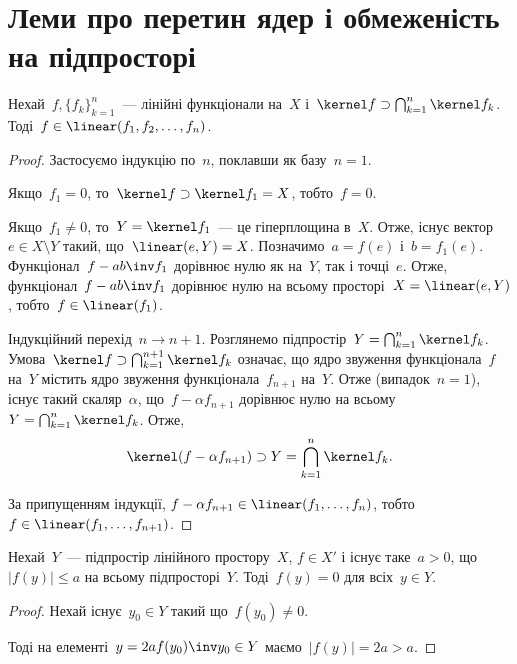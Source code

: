 \section{Леми про перетин ядер і обмеженість на підпросторі}

\begin{lemma}
    \label{lem:kernel-intersection-supset-linear-combination}
    Нехай~$f, \{f_k\}_{k = 1}^n$~--- лінійні функціонали на~$X$ і~$\kernel f \supset \bigcap_{k = 1}^n \kernel f_k$. Тоді~$f \in \linear(f_1, f_2, \dots, f_n)$.
\end{lemma}

\begin{proof}
    Застосуємо індукцію по~$n$, поклавши як базу~$n = 1$.

    Якщо~$f_1 = 0$, то~$\kernel f \supset \kernel f_1 = X$, тобто~$f = 0$.

    Якщо~$f_1 \ne 0$, то~$Y = \kernel f_1$~--- це гіперплощина в~$X$. Отже, існує вектор~$e \in X \setminus Y$ такий, що~$\linear(e, Y) = X$. Позначимо~$a = f(e)$ і~$b = f_1(e)$. Функціонал~$f - ab\inv f_1$ дорівнює нулю як на~$Y$, так і точці~$e$. Отже, функціонал~$f - ab\inv f_1$ дорівнює нулю на всьому просторі~$X = \linear(e, Y)$, тобто~$f \in \linear(f_1)$.

    Індукційний перехід~$n \to n + 1$. Розглянемо підпростір~$Y = \bigcap_{k = 1}^n \kernel f_k$. Умова~$\kernel f \supset \bigcap_{k = 1}^{n + 1} \kernel f_k$ означає, що ядро звуження функціонала~$f$ на~$Y$ містить ядро звуження функціонала~$f_{n + 1}$ на~$Y$. Отже (випадок~$n = 1$), існує такий скаляр~$\alpha$, що~$f - \alpha f_{n + 1}$ дорівнює нулю на всьому~$Y = \bigcap_{k = 1}^n \kernel f_k$. Отже,
    \begin{equation*}
        \kernel (f - \alpha f_{n + 1}) \supset Y = \bigcap_{k = 1}^n \kernel f_k.
    \end{equation*}

    За припущенням індукції, $f - \alpha f_{n + 1} \in \linear(f_1, \dots, f_n)$, тобто~$f \in \linear(f_1, \dots, f_{n + 1})$.
\end{proof}

\begin{lemma}
    \label{lem:linear-subspace-bounded-implies-zero}
    Нехай~$Y$~--- підпростір лінійного простору~$X$, $f \in X'$ і існує таке~$a > 0$, що~$|f(y)| \le a$ на всьому підпросторі~$Y$. Тоді~$f(y) = 0$ для всіх~$y \in Y$.
\end{lemma}

\begin{proof}
    Нехай існує~$y_0 \in Y$ такий що~$f(y_0) \ne 0$.
    
    Тоді на елементі~$y = 2 a f(y_0)\inv y_0 \in Y$ маємо~$|f(y)| = 2 a > a$.
\end{proof}

